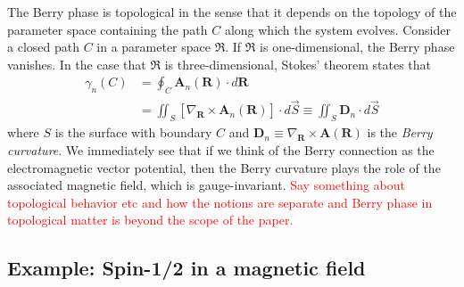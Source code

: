 \documentclass[reprint,
nofootinbib,
amsmath,amssymb,
aps]{revtex4-1}
\newcommand{\lb}{\left[}
\newcommand{\rb}{\right]}
\begin{document}
The Berry phase is topological in the sense that it depends on the topology of the parameter space containing the path $C$ along which the system evolves. Consider a closed path $C$ in a parameter space $\mathfrak{R}$. If $\mathfrak{R}$ is one-dimensional, the Berry phase vanishes. In the case that $\mathfrak{R}$ is three-dimensional, Stokes' theorem states that 
\begin{align*}
\gamma_n(C) &=  \oint_C \bm{A}_n(\bm{R}) \cdot d{\bm{R}} \\
&= \iint_{S} \lb  \nabla_{\bm{R}} \times \bm{A}_n(\bm{R}) \rb  \cdot d\vec{S} \equiv \iint_S \bm{D}_n \cdot d\vec{S}
\end{align*}
where $S$ is the surface with boundary $C$ and $\bm{D}_n \equiv \nabla_{\bm{R}} \times \bm{A}(\bm{R}) $ is the \textit{Berry curvature}. We immediately see that if we think of the Berry connection as the electromagnetic vector potential, then the Berry curvature plays the role of the associated magnetic field, which is gauge-invariant. \textcolor{red}{Say something about topological behavior etc and how the notions are separate and Berry phase in topological matter is beyond the scope of the paper.}



\subsection{Example: Spin-1/2 in a magnetic field}
\end{document}
